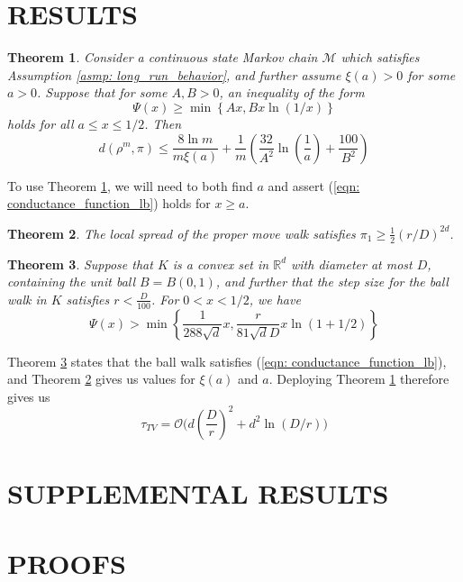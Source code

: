 \documentclass{article}
\newcommand{\Reals}{\mathbb{R}}
\newcommand{\set}[1]{\left\{#1\right\}}
\newcommand{\Rd}{\Reals^d}
\theoremstyle{alden}
\theoremstyle{aldenthm}
\newtheorem{theorem}{Theorem}
\theoremstyle{definition}
\theoremstyle{remark}
\begin{document}
\section{RESULTS}

\begin{theorem}
	\label{thm: conductance_function_lb}
	Consider a continuous state Markov chain $\mathcal{M}$ which satisfies Assumption \ref{asmp: long_run_behavior}, and further assume $\xi(a) > 0$ for some $a > 0$. Suppose that for some $A, B > 0$, an inequality of the form
	\begin{equation}
	\label{eqn: conductance_function_lb}
	\Psi(x) \geq \min \set{ Ax , B x \ln(1 / x)} 
	\end{equation}
	holds for all $a \leq x \leq 1/2$. Then
	\begin{equation*}
	d(\rho^m, \pi) \leq \frac{8 \ln m}{m \xi(a)} + \frac{1}{m} \left(\frac{32}{A^2} \ln\left(\frac{1}{a}\right) + \frac{100}{B^2}\right)
	\end{equation*}
\end{theorem}

To use Theorem \ref{thm: conductance_function_lb}, we will need to both find $a$ and assert (\ref{eqn: conductance_function_lb}) holds for $x \geq a$. 

\begin{theorem}
	\label{thm: local_spread}
	The local spread of the proper move walk satisfies $\pi_1 \geq \frac{1}{2} (r / D)^{2d}$.
\end{theorem}

\begin{theorem}
	\label{thm: conductance_function_lb_ballwalk}
	Suppose that $K$ is a convex set in $\Rd$ with diameter at most $D$, containing the unit ball $B = B(0,1)$, and further that the step size for the ball walk in $K$ satisfies $r < \frac{D}{100}$. For $0 < x < 1/2$, we have
	\begin{equation}
	\label{eqn: conductance_function_lb_ballwalk}
	\Psi(x) > \min \set{\frac{1}{288 \sqrt{d}} x, \frac{r}{81 \sqrt{d} D } x \ln(1 + 1/2) }
	\end{equation}
\end{theorem}

Theorem \ref{thm: conductance_function_lb_ballwalk} states that the ball walk satisfies (\ref{eqn: conductance_function_lb}), and Theorem \ref{thm: local_spread} gives us values for $\xi(a)$ and $a$. Deploying Theorem \ref{thm: conductance_function_lb} therefore gives us
\begin{equation*}
\tau_{TV} = \mathcal{O} \biggl(d\left(\frac{D}{r}\right)^2 + d^2\ln(D / r) \biggr)
\end{equation*}

\section{SUPPLEMENTAL RESULTS}

\section{PROOFS}
\end{document}
